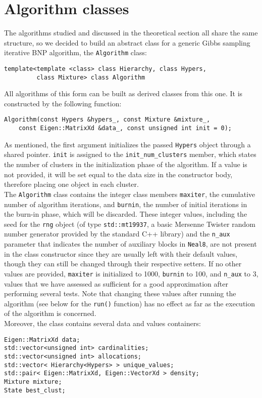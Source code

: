 \section{Algorithm classes}

The algorithms studied and discussed in the theoretical section all share the same structure, so we decided to build an abstract class for a generic Gibbs sampling iterative BNP algorithm, the \verb|Algorithm| class:
\begin{verbatim}
template<template <class> class Hierarchy, class Hypers,
         class Mixture> class Algorithm
\end{verbatim}
All algorithms of this form can be built as derived classes from this one.
It is constructed by the following function:
\begin{verbatim}
Algorithm(const Hypers &hypers_, const Mixture &mixture_,
    const Eigen::MatrixXd &data_, const unsigned int init = 0);
\end{verbatim}
As mentioned, the first argument initializes the passed \verb|Hypers| object through a shared pointer.
\verb|init| is assigned to the \verb|init_num_clusters| member, which states the number of clusters in the initialization phase of the algorithm.
If a value is not provided, it will be set equal to the data size in the constructor body, therefore placing one object in each cluster. \\
The \verb|Algorithm| class contains the integer class members \verb|maxiter|, the cumulative number of algorithm iterations, and \verb|burnin|, the number of initial iterations in the burn-in phase, which will be discarded.
These integer values, including the seed for the \verb|rng| object (of type \verb|std::mt19937|, a basic Mersenne Twister random number generator provided by the standard C++ library) and the \verb|n_aux| parameter that indicates the number of auxiliary blocks in \verb|Neal8|, are not present in the class constructor since they are usually left with their default values, though they can still be changed through their respective setters.
If no other values are provided, \verb|maxiter| is initialized to 1000, \verb|burnin| to 100, and \verb|n_aux| to 3, values that we have assessed as sufficient for a good approximation after performing several tests.
Note that changing these values after running the algorithm (see below for the \verb|run()| function) has no effect as far as the execution of the algorithm is concerned. \\
Moreover, the class contains several data and values containers:
\begin{verbatim}
Eigen::MatrixXd data;
std::vector<unsigned int> cardinalities;
std::vector<unsigned int> allocations;
std::vector< Hierarchy<Hypers> > unique_values;
std::pair< Eigen::MatrixXd, Eigen::VectorXd > density;
Mixture mixture;
State best_clust;
\end{verbatim}

